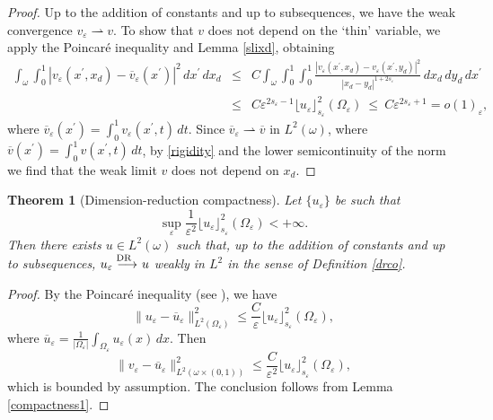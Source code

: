\documentclass[11pt]{article}
\newtheorem{theorem}[definition]{Theorem}
\def\e{\varepsilon}
\newcommand{\weak}{\rightharpoonup}
\begin{document}
\begin{proof}
Up to the addition of constants and up to subsequences, we have the weak convergence $v_\e\weak v$. 
To show that $v$ does not depend on the `thin' variable, we apply the Poincar\'e inequality and Lemma \ref{slixd}, obtaining 
\begin{eqnarray}\label{rigidity}
\int_\omega\int_0^1 |v_\e(x^\prime, x_d)- \overline v_\e(x^\prime)|^2\, dx^\prime\, dx_d&\leq&C \int_\omega \int_0^1\int_0^1 
\frac{|v_\e(x^\prime, x_d)-v_\e(x^\prime, y_d)|^2}{|x_d-y_d|^{1+2s_\e}}\, dx_d\, dy_d\, dx^\prime\nonumber \\
&\leq&C \e^{2s_\e-1} \lfloor u_\e\rfloor_{s_\e}^2(\Omega_\e)\ \leq \ C \e^{2s_\e+1}=o(1)_\e,
\end{eqnarray}
where $\overline v_\e(x^\prime)=\int_0^1v_\e(x^\prime,t)\, dt$. Since $\overline v_\e\weak \overline v$ in $L^2(\omega)$, 
where $\overline v(x^\prime)=\int_{0}^1v(x^\prime, t)\, dt$, by \eqref{rigidity} and the lower semicontinuity of the norm we find that the weak limit $v$ does not depend on $x_d$. 
\end{proof}




\begin{theorem}[Dimension-reduction compactness]\label{compactness2} Let $\{u_\e\}$ be such that 
$$\sup_\e \frac{1}{\e^2} \lfloor u_\e\rfloor_{s_\e}^2(\Omega_\e)<+\infty.$$ 
Then
there exists $u\in L^2(\omega)$ such that, up to the addition of constants and up to subsequences, 
$u_\e\buildrel{\hbox {\rm\scriptsize DR }\, \, }\over{\longrightarrow} u$ weakly in $L^2$ in the sense of Definition \rm \ref{drco}.  
\end{theorem}

%
%
%

\begin{proof}
By the Poincar\'e inequality (see \cite[Theorem 6.33]{leofrac}), we have
$$\|u_\e - \overline u_\e \|^2_{L^2(\Omega_\e)}\leq \frac{C}{\e}\lfloor u_\e\rfloor_{s_\e}^2(\Omega_\e), $$
where $\overline u_\e=\frac{1}{|\Omega_\e|}\int_{\Omega_\e} u_\e(x)\, dx$.  
Then
$$\|v_\e - \overline u_\e \|^2_{L^2(\omega\times(0,1))}\leq \frac{C}{\e^2}\lfloor u_\e\rfloor_{s_\e}^2(\Omega_\e),$$
which is bounded by assumption. The conclusion follows from Lemma \ref{compactness1}.
\end{proof}
\end{document}
